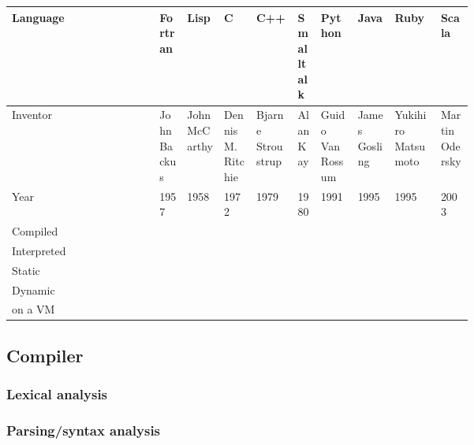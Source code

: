 \documentclass[12pt, a4paper]{article}
\newcommand{\cmark}{\textcolor{green!65!black}{\ding{51}}}
\newcommand{\xmark}{\textcolor{red!90!black}{\ding{55}}}
\begin{document}
{\tiny
\noindent\begin{tabular}{lp{0.06\linewidth}p{0.08\linewidth}p{0.07\linewidth}p{0.09\linewidth}p{0.05\linewidth}p{0.08\linewidth}p{0.08\linewidth}p{0.1\linewidth}p{0.07\linewidth}}
    Language    & Fortran     & Lisp          & C                 & C++               & Smalltalk & Python           & Java          & Ruby               & Scala \\
    \toprule
    Inventor    & John Backus & John McCarthy & Dennis M. Ritchie & Bjarne Stroustrup & Alan Kay  & Guido Van Rossum & James Gosling & Yukihiro Matsumoto & Martin Odersky \\
    \midrule
    Year        & 1957        & 1958          & 1972              & 1979              & 1980      & 1991             & 1995          & 1995               & 2003 \\
    \midrule
    Compiled    & \cmark{}    & \xmark{}      & \cmark{}          & \cmark{}          & \cmark{}  & \cmark{}         & \cmark{}      & \xmark{}           & \cmark{} \\
    \midrule
    Interpreted & \xmark{}    & \cmark{}      & \xmark{}          & \xmark{}          & \xmark{}  & \cmark{}         & \cmark{}      & \cmark{}           & \cmark{} \\
    \midrule
    Static      & \cmark{}    & \xmark{}      & \cmark{}          & \cmark{}          & \xmark{}  & \xmark{}         & \cmark{}      & \xmark{}           & \cmark{} \\
    \midrule
    Dynamic     & \xmark{}    & \cmark{}      & \xmark{}          & \xmark{}          & \cmark{}  & \cmark{}         & \xmark{}      & \cmark{}           & \xmark{} \\
    \midrule
    on a VM     &             &               & \xmark{}          & \xmark{}          & \cmark{}  & \cmark{}         & \cmark{}      & \cmark{}           & \cmark{} \\
    \bottomrule
\end{tabular}
}

    \subsection{Compiler}
    \subsubsection{Lexical analysis}
    \subsubsection{Parsing/syntax analysis}
\end{document}
